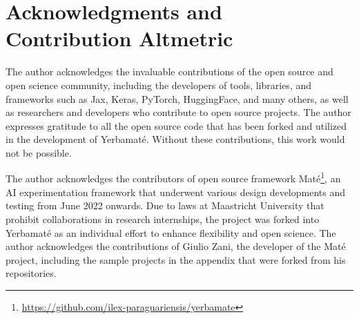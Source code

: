 

\section{Acknowledgments and Contribution Alt\-metric}

The author acknowledges the invaluable contributions of the open source and open science community, including the developers of tools, libraries, and frameworks such as Jax, Keras, PyTorch, HuggingFace, and many others, as well as researchers and developers who contribute to open source projects. The author expresses gratitude to all the open source code that has been forked and utilized in the development of Yerbamaté. Without these contributions, this work would not be possible.





The author acknowledges the contributors of open source framework Maté\footnote{\url{https://github.com/ilex-paraguariensis/yerbamate}}, an AI experimentation framework that underwent various design developments and testing from June 2022 onwards. Due to laws at Maastricht University that prohibit collaborations in research internships, the project was forked into Yerbamaté as an individual effort to enhance flexibility and open science. The author acknowledges the contributions of Giulio Zani, the developer of the Maté project, including the sample projects in the appendix that were forked from his repositories.

